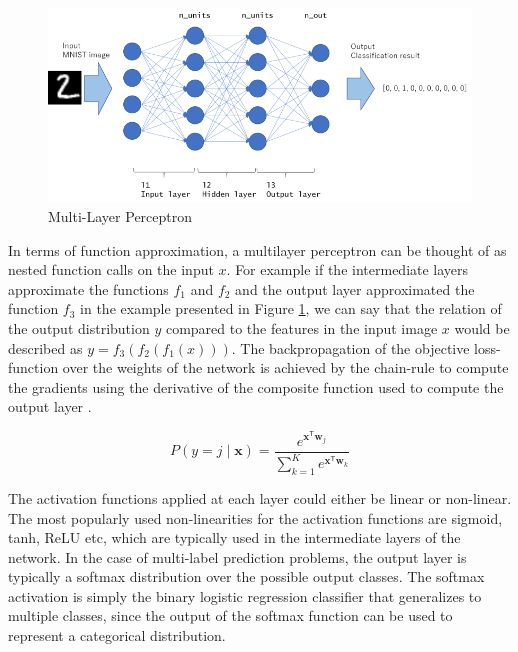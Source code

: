 \begin{figure}[ht]
	\centering
	\includegraphics[width=\textwidth]{images/mlp-network}
	\caption{\label{fig:mlp-network} Multi-Layer Perceptron}
\end{figure}

In terms of function approximation, a multilayer perceptron can be thought of as nested function calls on the input $x$. For example if the intermediate layers approximate the functions $f_1$ and $f_2$ and the output layer approximated the function $f_3$ in the example presented in Figure \ref{fig:mlp-network}, we can say that the relation of the output distribution $y$ compared to the features in the input image $x$ would be described as $y = f_3(f_2(f_1(x)))$. The backpropagation of the objective loss-function over the weights of the network is achieved by the chain-rule to compute the gradients using the derivative of the composite function used to compute the output layer \citep{lecun1989backpropagation}.

\begin{equation}
    P(y=j \mid \mathbf{x}) = \frac{e^{\mathbf{x}^\mathsf{T}\mathbf{w}_j}}{\sum_{k=1}^K e^{\mathbf{x}^\mathsf{T}\mathbf{w}_k}}
\end{equation}

The activation functions applied at each layer could either be linear or non-linear. The most popularly used non-linearities for the activation functions are sigmoid, tanh, ReLU etc, which are typically used in the intermediate layers of the network. In the case of multi-label prediction problems, the output layer is typically a softmax distribution over the possible output classes. The softmax activation is simply the binary logistic regression classifier that generalizes to multiple classes, since the output of the softmax function can be used to represent a categorical distribution.

